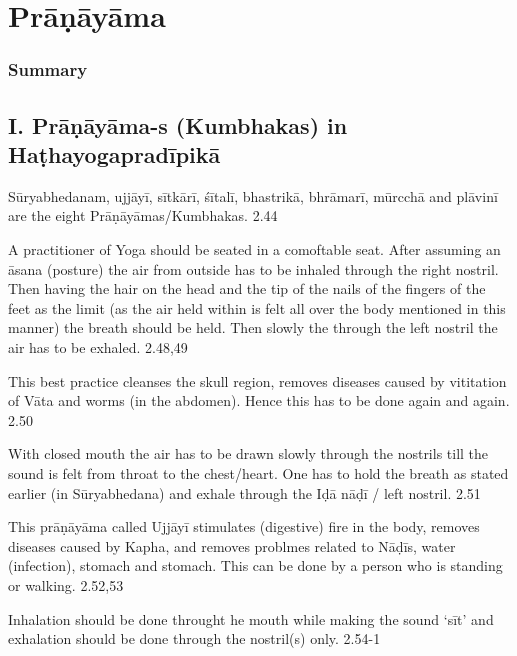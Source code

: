 \chapter{Prāṇāyāma}

\subsection*{Summary}

\section*{I. Prāṇāyāma-s (Kumbhakas) in Haṭhayogapradī\-pikā}

Sūryabhedanam, ujjāyī, sītkārī, śītalī, bhastrikā, bhrāmarī, mūrcchā and plāvinī are the eight Prāṇāyāmas/Kumbhakas. 2.44


A practitioner of Yoga should be seated in a comoftable seat. After assuming an āsana (posture) the air from outside has to be inhaled through the right nostril.  Then having the hair on the head and the tip of the nails of the fingers of the feet as the limit (as the air held within is felt all over the body mentioned in this manner) the breath should be held. Then slowly the through the left nostril the air has to be exhaled.  2.48,49


This best practice cleanses the skull region, removes diseases caused by vititation of Vāta and worms (in the abdomen). Hence this has to be done again and again. 2.50


With closed mouth the air has to be drawn slowly through the nostrils till the sound is felt from throat to the chest/heart. One has to hold the breath as stated earlier (in Sūryabhedana) and exhale through the Iḍā nāḍī / left nostril. 2.51


This prāṇāyāma called Ujjāyī stimulates (digestive) fire in the body, removes diseases caused by Kapha, and removes problmes related to Nāḍīs, water (infection), stomach and stomach. This can be done by a person who is standing or walking.  2.52,53


Inhalation should be done throught he mouth while making the sound ‘sīt’ and exhalation should be done through the nostril(s) only. 2.54-1

